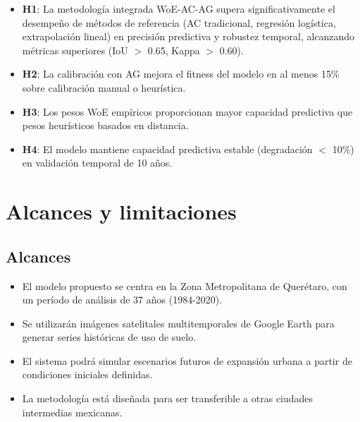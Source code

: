 \begin{itemize}
	\item \textbf{H1}: La metodología integrada WoE-AC-AG supera significativamente el desempeño de métodos de referencia (AC tradicional, regresión logística, extrapolación lineal) en precisión predictiva y robustez temporal, alcanzando métricas superiores (IoU $>$ 0.65, Kappa $>$ 0.60).
	\item \textbf{H2}: La calibración con AG mejora el fitness del modelo en al menos 15\% sobre calibración manual o heurística.
	\item \textbf{H3}: Los pesos WoE empíricos proporcionan mayor capacidad predictiva que pesos heurísticos basados en distancia.
	\item \textbf{H4}: El modelo mantiene capacidad predictiva estable (degradación $<$ 10\%) en validación temporal de 10 años.
\end{itemize}

\section{Alcances y limitaciones}

\subsection{Alcances}

\begin{itemize}
	\item El modelo propuesto se centra en la Zona Metropolitana de Querétaro, con un período de análisis de 37 años (1984-2020).
	\item Se utilizarán imágenes satelitales multitemporales de Google Earth para generar series históricas de uso de suelo.
	\item El sistema podrá simular escenarios futuros de expansión urbana a partir de condiciones iniciales definidas.
	\item La metodología está diseñada para ser transferible a otras ciudades intermedias mexicanas.
\end{itemize}

